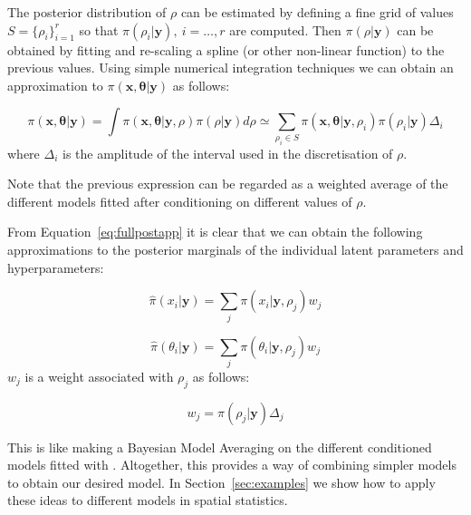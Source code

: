 \documentclass[article]{jss}
\begin{document}
The posterior distribution of $\rho$ can be estimated by defining a fine grid
of values $S=\{\rho_i\}_{i=1}^r$ so that $\pi(\rho_i|\mathbf{y}),\ i=\ldots,r$
are computed.  Then $\pi(\rho|\mathbf{y})$ can be obtained by fitting and
re-scaling a spline (or other non-linear function) to the previous values.
Using simple numerical integration techniques we can obtain an approximation to
$\pi(\mathbf{x}, \mathbf{\theta}|\mathbf{y})$ as follows:

\begin{equation}
\pi(\mathbf{x}, \mathbf{\theta}|\mathbf{y}) = \int \pi(\mathbf{x}, \mathbf{\theta}|\mathbf{y}, \rho)\pi(\rho|\mathbf{y})d\rho
\simeq
\sum_{\rho_i\in S}\pi(\mathbf{x}, \mathbf{\theta}|\mathbf{y}, \rho_i)  
\pi(\rho_i|\mathbf{y}) \Delta_i
\label{eq:fullpostapp}
\end{equation}
\noindent
where $\Delta_i$ is the amplitude of the interval used in the discretisation
of $\rho$.

Note that the previous expression can be regarded as a weighted average
of the different models fitted after conditioning on different values of
$\rho$.

From Equation~\ref{eq:fullpostapp} it is clear that we can obtain the following
approximations to the posterior marginals of the individual latent parameters
and hyperparameters:

\begin{equation}
\hat{\pi}(x_i|\mathbf{y}) = \sum_j \pi(x_i|\mathbf{y}, \rho_j) w_j
\end{equation}

\begin{equation}
\hat{\pi}(\theta_i|\mathbf{y}) = \sum_j \pi(\theta_i|\mathbf{y}, \rho_j) w_j
\end{equation}
\noindent
$w_j$ is a weight associated with $\rho_j$ as follows:

\begin{equation}
w_j = \pi(\rho_j|\mathbf{y})\Delta_j
\end{equation}


This is like making a Bayesian Model Averaging \citep{Hoetingetal:1999} on the
different conditioned models fitted with . Altogether, this
provides a way of combining simpler models to obtain our desired model. In
Section~\ref{sec:examples} we show how to apply these ideas to different models
in spatial statistics.


%
\end{document}
